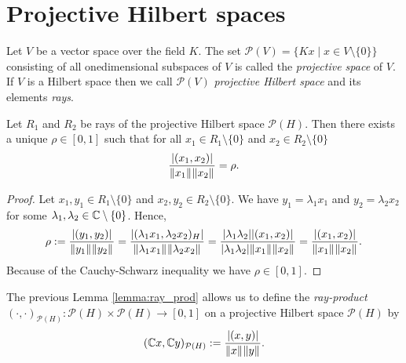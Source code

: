 \section{Projective Hilbert spaces}

\begin{definition}
	Let $V$ be a vector space over the field $K$. The set $\mathcal{P}(V) = \{Kx \mid x \in V \setminus \{0\}\}$ consisting of all onedimensional subspaces of $V$ is called the \textit{projective space} of $V$. If $V$ is a Hilbert space then we call $\mathcal{P}(V)$ \textit{projective Hilbert space} and its elements \textit{rays}.
\end{definition}


\begin{lemma} \label{lemma:ray_prod}
	Let $R_1$ and $R_2$ be rays of the projective Hilbert space $\mathcal{P}(H)$. Then there exists a unique $\rho \in [0, 1]$ such that for all $x_1 \in R_1 \setminus \{0\}$ and $x_2 \in R_2 \setminus \{0\}$
	\begin{align*}
		\frac{\vbraces{(x_1, x_2)}}{\norm[]{x_1} \norm[]{x_2}} = \rho.
	\end{align*}
\end{lemma}

\begin{proof}
	Let $x_1, y_1 \in R_1 \setminus \{0\}$ and $x_2, y_2 \in R_2 \setminus \{0\}$. We have $y_1 = \lambda_1 x_1$ and $y_2 = \lambda_2 x_2$ for some $\lambda_1, \lambda_2 \in \C \setminus \{0\}$. Hence,
	\begin{align*}
		\rho := \frac{\vbraces{(y_1, y_2)}}{\norm[]{y_1} \norm[]{y_2}} = \frac{\vbraces{(\lambda_1 x_1, \lambda_2 x_2)_H}}{\norm[]{\lambda_1 x_1} \norm[]{\lambda_2 x_2}} = \frac{\vbraces{\lambda_1 \lambda_2}\vbraces{(x_1, x_2)}}{\vbraces{\lambda_1 \lambda_2}\norm[]{x_1} \norm[]{x_2}} = \frac{\vbraces{(x_1, x_2)}}{\norm[]{x_1} \norm[]{x_2}}.
	\end{align*}
	Because of the Cauchy-Schwarz inequality we have $\rho \in [0,1]$. 
\end{proof}


\begin{definition}
	The previous Lemma \ref{lemma:ray_prod} allows us to define the \textit{ray-product} $(\cdot, \cdot)_{\mathcal{P}(H)}: \mathcal{P}(H) \times \mathcal{P}(H) \to [0,1]$ on a projective Hilbert space $\mathcal{P}(H)$ by
	\begin{align*}
		 (\C x, \C y)_{\mathcal{P}(H)} := \frac{\vbraces{(x, y)}}{\norm[]{x} \norm[]{y}}.
	\end{align*}
\end{definition}


